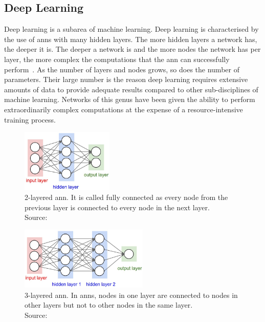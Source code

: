 \documentclass[
			   fontsize=11pt,
               paper=a4,
               bibliography=totoc,
               idxtotoc,
               headsepline,
               footsepline,
               footinclude=false,
               BCOR=12mm,
               DIV=13,
               openany,   %
               ]
               {scrbook}
\begin{document}

\subsection{Deep Learning}

Deep learning is a subarea of machine learning. Deep learning is characterised by the use of \glspl{ann} with many hidden layers. The more hidden layers a network has, the deeper it is. The deeper a network is and the more nodes the network has per layer, the more complex the computations that the \gls{ann} can successfully perform~\cite{dlBookGoodf}. As the number of layers and nodes grows, so does the number of parameters. Their large number is the reason deep learning requires extensive amounts of data to provide adequate results compared to other sub-disciplines of machine learning. Networks of this genus have been given the ability to perform extraordinarily complex computations at the expense of a resource-intensive training process.

\begin{multicols}{2} %
	\begin{figure}[H] %
		\centering
		\includegraphics[height=3cm]{figures/ann1.jpeg}
		\caption[2-Layered ANN]{2-layered \gls{ann}. It is called fully connected as every node from the previous layer is connected to every node in the next layer. \\
			\tiny{Source:~\cite{annGraphics}}}
		\label{fig:2layeredANN} %
	\end{figure}
	
	\columnbreak    %
	
	\begin{figure}[H] %
		\centering
		\includegraphics[height=3cm]{figures/ann2.jpeg}
		\caption[3-Layered ANN]{3-layered \gls{ann}. In \glspl{ann}, nodes in one layer are connected to nodes in other layers but not to other nodes in the same layer. \\
			\tiny{Source:~\cite{annGraphics}}}
		\label{fig:3layeredANN} %
	\end{figure}
\end{multicols}
\end{document}
